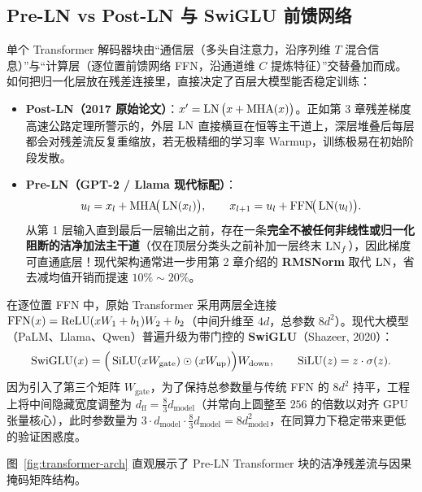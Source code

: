 \subsection{Pre-LN vs Post-LN 与 SwiGLU 前馈网络}

单个 Transformer 解码器块由“通信层（多头自注意力，沿序列维 $T$ 混合信息）”与“计算层（逐位置前馈网络 FFN，沿通道维 $C$ 提炼特征）”交替叠加而成。如何把归一化层放在残差连接里，直接决定了百层大模型能否稳定训练：
\begin{itemize}
  \item \textbf{Post-LN（2017 原始论文）}：$x' = \operatorname{LN}\big(x + \mathrm{MHA}(x)\big)$。正如第 3 章残差梯度高速公路定理所警示的，外层 $\operatorname{LN}$ 直接横亘在恒等主干道上，深层堆叠后每层都会对残差流反复重缩放，若无极精细的学习率 Warmup，训练极易在初始阶段发散。
  \item \textbf{Pre-LN（GPT-2 / Llama 现代标配）}：
  \begin{equation}
    u_l = x_l + \mathrm{MHA}\!\big(\operatorname{LN}(x_l)\big), \qquad
    x_{l+1} = u_l + \mathrm{FFN}\!\big(\operatorname{LN}(u_l)\big).
    \label{eq:pre-ln}
  \end{equation}
  从第 1 层输入直到最后一层输出之前，存在一条\textbf{完全不被任何非线性或归一化阻断的洁净加法主干道}（仅在顶层分类头之前补加一层终末 $\operatorname{LN}_f$），因此梯度可直通底层！现代架构通常进一步用第 2 章介绍的 \textbf{RMSNorm} 取代 $\operatorname{LN}$，省去减均值开销而提速 $10\% \sim 20\%$。
\end{itemize}

在逐位置 FFN 中，原始 Transformer 采用两层全连接 $\mathrm{FFN}(x) = \operatorname{ReLU}(x W_1 + b_1) W_2 + b_2$（中间升维至 $4d$，总参数 $8d^2$）。现代大模型（PaLM、Llama、Qwen）普遍升级为带门控的 \textbf{SwiGLU}（Shazeer, 2020）：
\begin{equation}
  \mathrm{SwiGLU}(x) = \Big(\operatorname{SiLU}(x W_{\text{gate}}) \odot (x W_{\text{up}})\Big) W_{\text{down}},
  \qquad
  \operatorname{SiLU}(z) = z \cdot \sigma(z).
  \label{eq:swiglu}
\end{equation}
因为引入了第三个矩阵 $W_{\text{gate}}$，为了保持总参数量与传统 FFN 的 $8d^2$ 持平，工程上将中间隐藏宽度调整为 $d_{\text{ff}} = \frac{8}{3} d_{\text{model}}$（并常向上圆整至 $256$ 的倍数以对齐 GPU 张量核心），此时参数量为 $3 \cdot d_{\text{model}} \cdot \frac{8}{3} d_{\text{model}} = 8 d_{\text{model}}^2$，在同算力下稳定带来更低的验证困惑度。

图~\ref{fig:transformer-arch} 直观展示了 Pre-LN Transformer 块的洁净残差流与因果掩码矩阵结构。

